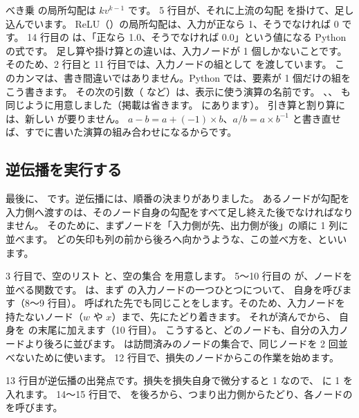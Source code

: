 
べき乗  の局所勾配は $k v^{k-1}$ です。
5 行目が、それに上流の勾配  を掛けて、足し込んでいます。
ReLU（）の局所勾配は、入力が正なら 1、そうでなければ 0 です。
14 行目の  は、「正なら 1.0、そうでなければ 0.0」という値になる Python の式です。
足し算や掛け算との違いは、入力ノードが 1 個しかないことです。
そのため、2 行目と 11 行目では、入力ノードの組として  を渡しています。
このカンマは、書き間違いではありません。Python では、要素が 1 個だけの組をこう書きます。
その次の引数（ など）は、表示に使う演算の名前です。
、、 も同じように用意しました（掲載は省きます。 にあります）。
引き算と割り算には、新しい  が要りません。
$a-b=a+(-1)\times b$、$a/b=a\times b^{-1}$ と書き直せば、すでに書いた演算の組み合わせになるからです。

\subsection*{逆伝播を実行する}

最後に、 です。逆伝播には、順番の決まりがありました。
あるノードが勾配を入力側へ渡すのは、そのノード自身の勾配をすべて足し終えた後でなければなりません。
そのために、まずノードを「入力側が先、出力側が後」の順に 1 列に並べます。
どの矢印も列の前から後ろへ向かうような、この並べ方を、といいます。


3 行目で、空のリスト  と、空の集合  を用意します。
5〜10 行目の  が、ノードを並べる関数です。
 は、まず  の入力ノードの一つひとつについて、 自身を呼びます（8〜9 行目）。
呼ばれた先でも同じことをします。そのため、入力ノードを持たないノード（$w$ や $x$）まで、先にたどり着きます。
それが済んでから、 自身を  の末尾に加えます（10 行目）。
こうすると、どのノードも、自分の入力ノードより後ろに並びます。
 は訪問済みのノードの集合で、同じノードを 2 回並べないために使います。
12 行目で、損失のノードからこの作業を始めます。

13 行目が逆伝播の出発点です。損失を損失自身で微分すると 1 なので、 に 1 を入れます。
14〜15 行目で、 を後ろから、つまり出力側からたどり、各ノードの  を呼びます。

